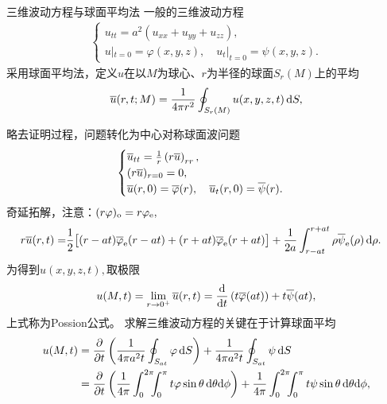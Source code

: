 \begin{example}{三维波动方程与球面平均法}{}
	一般的三维波动方程
	\begin{align*}
		\begin{cases}
			u_{tt}=a^2(u_{xx}+u_{yy}+u_{zz}),                     \\
			u|_{t=0}=\varphi(x,y,z),\quad u_t|_{t=0}=\psi(x,y,z).
		\end{cases}
	\end{align*}
	采用球面平均法，定义$u$在以$M$为球心、$r$为半径的球面$S_r(M)$上的平均
	\[
		\overline u(r,t;M)=\frac1{4\pi r^2}\oint_{S_r(M)}u(x,y,z,t)\mathop{}\!\mathrm{d} S,
	\]
	
	略去证明过程，问题转化为中心对称球面波问题
	\begin{align*}
		\begin{cases}
			\overline u_{tt}=\frac1r\left(r\overline u\right)_{rr},                                \\
			(r\overline u)_{r=0}=0,                                                        \\
			\overline u(r,0)=\overline\varphi(r),\quad\overline u_t(r,0)=\overline\psi(r).
		\end{cases}
	\end{align*}
	奇延拓解，注意：$(r\varphi)_\mathrm o=r\varphi_\mathrm e,$
	{\small\begin{align*}
		r\overline u(r,t)= & \frac12\bigl[(r-at)\overline\varphi_\mathrm e(r-at)+(r+at)\overline\varphi_\mathrm e(r+at)\bigr]+\frac1{2a}\int_{r-at}^{r+at}\rho\overline\psi_\mathrm e(\rho)\mathop{}\!\mathrm{d}\rho.
	\end{align*}}
	为得到$u(x,y,z,t),$取极限
	\begin{align*}
		u(M,t)=\lim_{r\to 0^+}\overline u(r,t)
		=\frac{\mathrm{d}^{\;\!\!}}{\mathrm{d} t^{\;\!\!}}\left(t\overline\varphi(at)\right)+t\overline\psi(at),
	\end{align*}
	上式称为Possion公式。
	\tcblower
	求解三维波动方程的关键在于计算球面平均
	\begin{align}\label{3D-Wave}
		u(M,t) & =\pp t\kh{\frac1{4\pi a^2t}\oint_{S_{at}}\varphi\d S}+\frac1{4\pi a^2t}\oint_{S_{at}}\psi\d S\\\notag
		& =\pp t\kh{\frac1{4\pi}\int_0^{2\pi}\bs5\int_0^\pi t\varphi\sin\theta\d\theta\nd\phi}+\frac1{4\pi}\int_0^{2\pi}\bs5\int_0^\pi t\psi\sin\theta\d\theta\nd\phi,
	\end{align}
\end{example}

